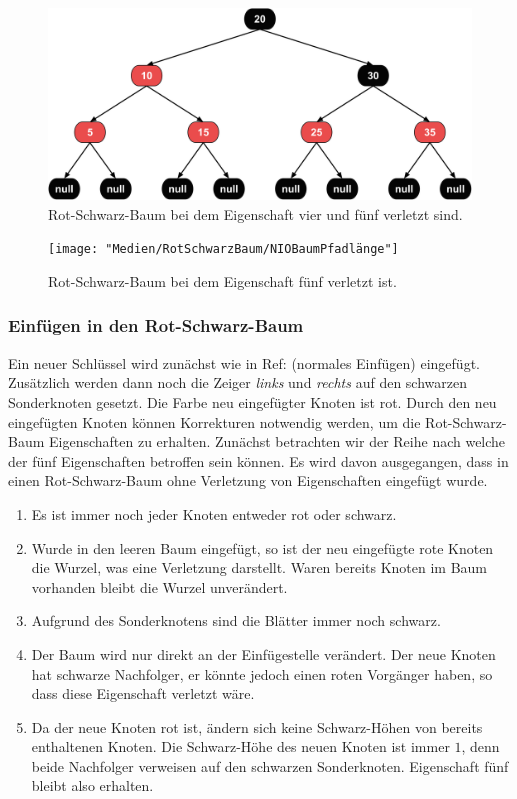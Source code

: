 \documentclass[a4paper,12pt]{article}
\begin{document}
\begin{figure}[h]
	\centering
	\includegraphics[width= 1\textwidth]{"Medien/RotSchwarzBaum/NIOBaumZweiRote"}
	\caption{Rot-Schwarz-Baum bei dem Eigenschaft vier und fünf verletzt sind. }
	\label{fig:NIOBaumZweiRote}
\end{figure}
\begin{figure}[h]
	\centering
	\texttt{[image: "Medien/RotSchwarzBaum/NIOBaumPfadlänge"]}
	\caption{Rot-Schwarz-Baum bei dem Eigenschaft fünf verletzt ist.  }
	\label{fig:NIOBaumPfadlänge}
\end{figure}


\subsubsection{Einfügen in den Rot-Schwarz-Baum}
Ein neuer Schlüssel wird zunächst wie in Ref: (normales Einfügen) eingefügt. Zusätzlich werden dann noch die Zeiger \textit{links} und  \textit{rechts} auf den schwarzen Sonderknoten gesetzt. Die Farbe neu eingefügter Knoten ist rot. Durch den neu eingefügten Knoten können Korrekturen notwendig werden, um die Rot-Schwarz-Baum Eigenschaften zu erhalten. Zunächst betrachten wir der Reihe nach welche der fünf Eigenschaften betroffen sein können. Es wird davon ausgegangen, dass in einen Rot-Schwarz-Baum ohne Verletzung von Eigenschaften eingefügt wurde. \\

\begin{enumerate}
	\item Es ist immer noch jeder Knoten entweder rot oder schwarz.
	\item Wurde in den leeren Baum eingefügt, so ist der neu eingefügte rote Knoten die Wurzel, was eine Verletzung darstellt. Waren bereits Knoten im Baum vorhanden bleibt die Wurzel unverändert.
	\item Aufgrund des Sonderknotens sind die Blätter immer noch schwarz.
	\item Der Baum wird nur direkt an der Einfügestelle verändert. Der neue Knoten hat schwarze Nachfolger, er könnte jedoch einen roten Vorgänger haben, so dass diese Eigenschaft verletzt wäre.
	\item Da der neue Knoten rot ist, ändern sich keine Schwarz-Höhen von bereits enthaltenen Knoten. Die Schwarz-Höhe des neuen Knoten ist immer $1$, denn beide Nachfolger verweisen auf den schwarzen Sonderknoten. Eigenschaft fünf bleibt also erhalten. 
\end{enumerate}  
\end{document}
